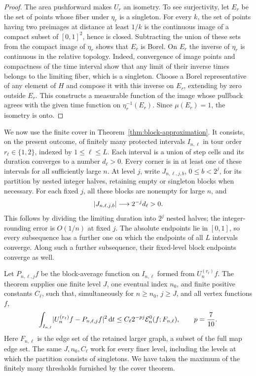 \begin{proof}
The area pushforward makes \(U_r\) an isometry.  To see surjectivity, let
\(E_r\) be the set of points whose fiber under \(\eta_r\) is a singleton.
For every \(k\), the set of points having two preimages at distance at least
\(1/k\) is the continuous image of a compact subset of \([0,1]^2\), hence
is closed.  Subtracting the union of these sets from the compact image of
\(\eta_r\) shows that \(E_r\) is Borel.  On \(E_r\) the inverse of
\(\eta_r\) is continuous in the relative topology.  Indeed, convergence
of image points and compactness of the time interval show that any limit
of their inverse times belongs to the limiting fiber, which is a singleton.
Choose a Borel representative of any element of \(H\) and compose it with
this inverse on \(E_r\), extending by zero outside \(E_r\).  This constructs
a measurable function of the image whose pullback agrees with the given
time function on \(\eta_r^{-1}(E_r)\).  Since \(\mu(E_r)=1\), the isometry
is onto.
\end{proof}

We now use the finite cover in Theorem~\ref{thm:block-approximation}.
It consists, on the present outcome, of finitely many protected intervals
\(I_{n,\ell}\) in tour order \(r_\ell\in\{1,2\}\), indexed by
\(1\le\ell\le L\).  Each interval is a union of step cells and its duration
converges to a number \(d_\ell>0\).  Every corner is in at least one of
these intervals for all
sufficiently large \(n\).  At level \(j\), write
\(J_{n,\ell,j,b}\), \(0\le b<2^j\), for its partition by nested integer
halves, retaining empty or singleton blocks when necessary.  For each fixed
\(j\), all these blocks are nonempty for large \(n\), and
\begin{equation}\label{eq:block-positive-length}
 \lvert J_{n,\ell,j,b}\rvert\longrightarrow 2^{-j}d_\ell>0.
\end{equation}
This follows by dividing the limiting duration into \(2^j\) nested halves;
the integer-rounding error is \(O(1/n)\) at fixed \(j\).  The absolute
endpoints lie in \([0,1]\), so every subsequence has a further one on which
the endpoints of all \(L\) intervals converge.  Along such a further
subsequence, their fixed-level block endpoints converge as well.

Let \(P_{n,\ell,j}f\) be the block-average function on \(I_{n,\ell}\)
formed from \(U_n^{(r_\ell)}f\).  The theorem supplies one finite level
\(J\), one eventual index \(n_0\), and finite positive constants
\(C_\ell\), such that, simultaneously for \(n\ge n_0\), \(j\ge J\), and all
vertex functions \(f\),
\begin{equation}\label{eq:covered-block-estimate}
 \int_{I_{n,\ell}}
    \lvert U_n^{(r_\ell)}f-P_{n,\ell,j}f\rvert^{2}\,\mathrm d t
 \le C_\ell 2^{-pj}\mathcal E_n^0(f;F_{n,\ell}),
 \qquad p=\frac7{10}.
\end{equation}
Here \(F_{n,\ell}\) is the edge set of the retained larger graph, a subset
of the full map edge set.  The same \(J,n_0,C_\ell\) work for every finer
level, including the levels at which the partition consists of singletons.
We have taken the maximum of the finitely many thresholds furnished by the
cover theorem.


